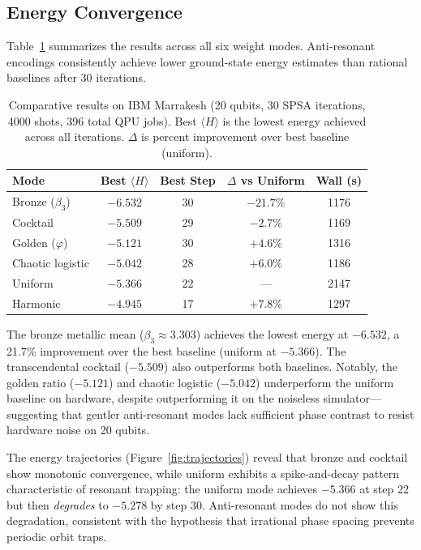\documentclass[twocolumn,showpacs,preprintnumbers,amsmath,amssymb,aps,prl]{revtex4-2}
\begin{document}
\subsection{Energy Convergence}

Table~\ref{tab:results} summarizes the results across all six weight modes. Anti-resonant encodings consistently achieve lower ground-state energy estimates than rational baselines after 30 iterations.

\begin{table}[h]
\centering
\caption{Comparative results on IBM Marrakesh (20 qubits, 30 SPSA iterations, 4000 shots, 396 total QPU jobs). Best $\langle H\rangle$ is the lowest energy achieved across all iterations. $\Delta$ is percent improvement over best baseline (uniform).}
\label{tab:results}
\begin{tabular}{lcccc}
\toprule
\textbf{Mode} & \textbf{Best $\langle H\rangle$} & \textbf{Best Step} & \textbf{$\Delta$ vs Uniform} & \textbf{Wall (s)} \\
\midrule
Bronze ($\beta_3$) & $\mathbf{-6.532}$ & 30 & $\mathbf{-21.7\%}$ & 1176 \\
Cocktail & $-5.509$ & 29 & $-2.7\%$ & 1169 \\
Golden ($\varphi$) & $-5.121$ & 30 & $+4.6\%$ & 1316 \\
Chaotic logistic & $-5.042$ & 28 & $+6.0\%$ & 1186 \\
\midrule
Uniform & $-5.366$ & 22 & --- & 2147 \\
Harmonic & $-4.945$ & 17 & $+7.8\%$ & 1297 \\
\bottomrule
\end{tabular}
\end{table}

The bronze metallic mean ($\beta_3 \approx 3.303$) achieves the lowest energy at $-6.532$, a 21.7\% improvement over the best baseline (uniform at $-5.366$). The transcendental cocktail ($-5.509$) also outperforms both baselines. Notably, the golden ratio ($-5.121$) and chaotic logistic ($-5.042$) underperform the uniform baseline on hardware, despite outperforming it on the noiseless simulator---suggesting that gentler anti-resonant modes lack sufficient phase contrast to resist hardware noise on 20 qubits.

The energy trajectories (Figure~\ref{fig:trajectories}) reveal that bronze and cocktail show monotonic convergence, while uniform exhibits a spike-and-decay pattern characteristic of resonant trapping: the uniform mode achieves $-5.366$ at step 22 but then \emph{degrades} to $-5.278$ by step 30. Anti-resonant modes do not show this degradation, consistent with the hypothesis that irrational phase spacing prevents periodic orbit traps.
\end{document}
